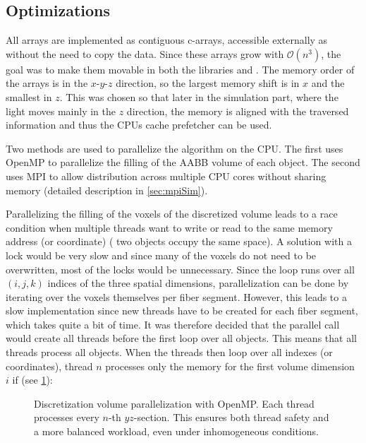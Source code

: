 \subsection{Optimizations}\label{sec:dvOpti}
%
All arrays are implemented as contiguous c-arrays, accessible externally as  without the need to copy the data.
Since these arrays grow with $\mathcal{O}(n^3)$, the goal was to make them movable in both the \cpp{} libraries and \python{}.
The memory order of the arrays is in the $x\text{-}y\text{-}z$ direction, so the largest memory shift is in $x$ and the smallest in $z$.
This was chosen so that later in the simulation part, where the light moves mainly in the $z$ direction, the memory is aligned with the traversed information and thus the \acp{CPU} cache prefetcher can be used.
\par
%
Two methods are used to parallelize the algorithm on the \ac{CPU}.
The first uses \ac{OpenMP} to parallelize the filling of the \ac{AABB} volume of each object.
The second uses \ac{MPI} to allow distribution across multiple \ac{CPU} cores without sharing memory (detailed description in \cref{sec:mpiSim}).
\par
%
Parallelizing the filling of the voxels of the discretized volume leads to a race condition when multiple threads want to write or read to the same memory address (or coordinate) (\eg{} two objects occupy the same space).
A solution with a lock would be very slow and since many of the voxels do not need to be overwritten, most of the locks would be unnecessary.
Since the loop runs over all $(i,j,k)$ indices of the three spatial dimensions, parallelization can be done by iterating over the voxels themselves per fiber segment.
However, this leads to a slow implementation since new threads have to be created for each fiber segment, which takes quite a bit of time.
It was therefore decided that the parallel call would create all threads before the first loop over all objects.
This means that all threads process all objects.
When the threads then loop over all indexes (or coordinates), thread $n$ processes only the memory for the first volume dimension $i$ if (see \cref{fig:discVolThread}):
%
\begin{figure}[!t]
\centering
\setlength{\tikzwidth}{0.5\textwidth}
\caption{Discretization volume parallelization with \ac{OpenMP}. Each thread processes every $n$-th $yz$-section. This ensures both thread safety and a more balanced workload, even under inhomogeneous conditions.}
\label{fig:discVolThread}
\end{figure}
